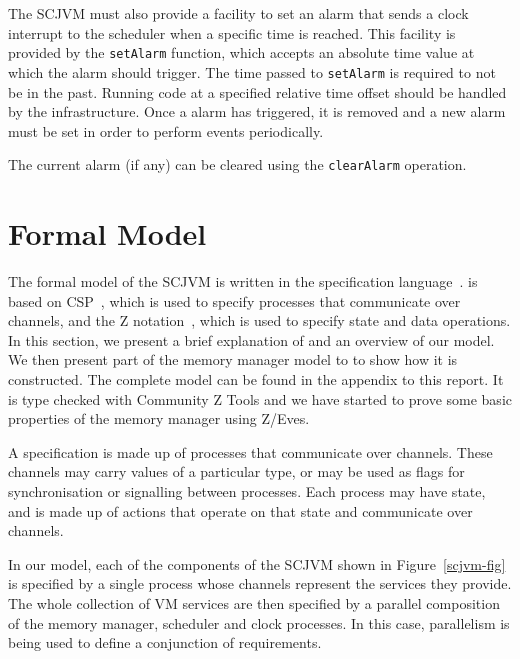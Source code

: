 \documentclass[a4paper,10pt]{report}
\begin{document}
The SCJVM must also provide a facility to set an alarm that sends a clock
interrupt to the scheduler when a specific time is reached. This facility is
provided by the \texttt{set\-Alarm} function, which accepts an absolute time
value at which the alarm should trigger. The time passed to \texttt{set\-Alarm}
is required to not be in the past. Running code at a specified relative time
offset should be handled by the infrastructure. Once a alarm has triggered, it
is removed and a new alarm must be set in order to perform events periodically.

The current alarm (if any) can be cleared using the \texttt{clear\-Alarm}
operation.

\section{Formal Model}
\label{formal-model-section}

The formal model of the SCJVM is written in the \Circus{} specification
language~\cite{oliveira2009}. \Circus{} is based on CSP~\cite{roscoe2011}, which
is used to specify processes that communicate over channels, and the Z
notation~\cite{woodcock1996}, which is used to specify state and data
operations. In this section, we present a brief explanation of \Circus{} and an
overview of our model. We then present part of the memory manager model to to
show how it is constructed. The complete model can be found
in the appendix to this report. It is type checked with Community Z Tools and we have
started to prove some basic properties of the memory manager using Z/Eves.

A \Circus{} specification is made up of processes that communicate over
channels.  These channels may carry values of a particular type, or may be used
as flags for synchronisation or signalling between processes.  Each process may
have state, and is made up of actions that operate on that state and communicate
over channels.

In our model, each of the components of the SCJVM shown in
Figure~\ref{scjvm-fig} is specified by a single process whose channels represent
the services they provide.  The whole collection of VM services are then
specified by a parallel composition of the memory manager, scheduler and clock
processes. In this case, parallelism is being used to define a conjunction of
requirements. 
\end{document}
